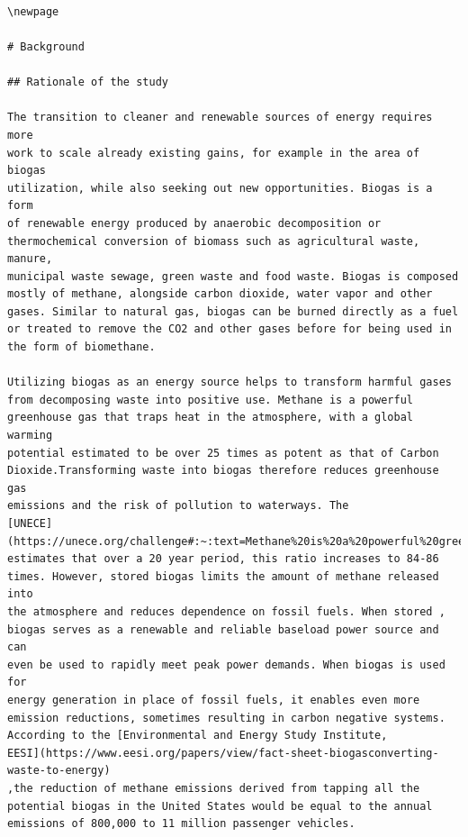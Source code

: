 \documentclass[
  12pt,
]{article}
\begin{document}
\begin{verbatim}



\newpage

# Background

## Rationale of the study

The transition to cleaner and renewable sources of energy requires more
work to scale already existing gains, for example in the area of biogas
utilization, while also seeking out new opportunities. Biogas is a form
of renewable energy produced by anaerobic decomposition or
thermochemical conversion of biomass such as agricultural waste, manure,
municipal waste sewage, green waste and food waste. Biogas is composed
mostly of methane, alongside carbon dioxide, water vapor and other
gases. Similar to natural gas, biogas can be burned directly as a fuel
or treated to remove the CO2 and other gases before for being used in
the form of biomethane.

Utilizing biogas as an energy source helps to transform harmful gases
from decomposing waste into positive use. Methane is a powerful
greenhouse gas that traps heat in the atmosphere, with a global warming
potential estimated to be over 25 times as potent as that of Carbon
Dioxide.Transforming waste into biogas therefore reduces greenhouse gas
emissions and the risk of pollution to waterways. The
[UNECE](https://unece.org/challenge#:~:text=Methane%20is%20a%20powerful%20greenhouses,grows%20to%2084%2D86%20times.)
estimates that over a 20 year period, this ratio increases to 84-86
times. However, stored biogas limits the amount of methane released into
the atmosphere and reduces dependence on fossil fuels. When stored ,
biogas serves as a renewable and reliable baseload power source and can
even be used to rapidly meet peak power demands. When biogas is used for
energy generation in place of fossil fuels, it enables even more
emission reductions, sometimes resulting in carbon negative systems.
According to the [Environmental and Energy Study Institute,
EESI](https://www.eesi.org/papers/view/fact-sheet-biogasconverting-waste-to-energy)
,the reduction of methane emissions derived from tapping all the
potential biogas in the United States would be equal to the annual
emissions of 800,000 to 11 million passenger vehicles.


\end{verbatim}
\end{document}
